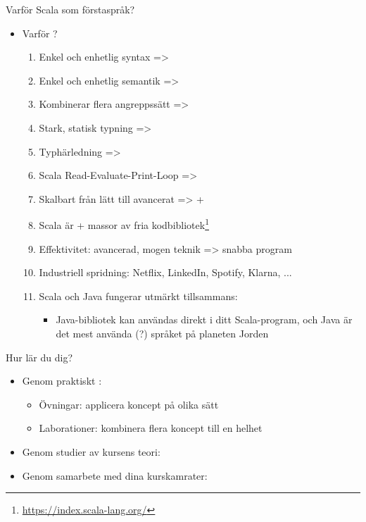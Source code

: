 \begin{SlideExtra}{Varför Scala som förstaspråk?}
\begin{itemize}
\item Varför ?
\begin{enumerate}
\item Enkel och enhetlig syntax => 
\item Enkel och enhetlig semantik => 
\item Kombinerar flera angreppssätt => 
\item Stark, statisk typning =>  
\item Typhärledning => 
\item Scala Read-Evaluate-Print-Loop => 
\item Skalbart från lätt till avancerat =>  + 
\item Scala är  + massor av fria kodbibliotek\footnote{\url{https://index.scala-lang.org/}} 
\item Effektivitet: avancerad, mogen teknik => snabba program
\item Industriell spridning: Netflix, LinkedIn, Spotify, Klarna, ...
\item Scala och Java fungerar utmärkt tillsammans:
\begin{itemize}
\item Java-bibliotek kan användas direkt i ditt Scala-program, och Java är det mest använda (?) språket på planeten Jorden
\end{itemize}
\end{enumerate}
\end{itemize}
\end{SlideExtra}
\fi


\begin{Slide}{Hur lär du dig?}
\begin{itemize}
\item Genom praktiskt : 
\begin{itemize}
\item Övningar: applicera koncept på olika sätt
\item Laborationer: kombinera flera koncept till en helhet
\end{itemize}
\item Genom studier av kursens teori: 
\item Genom samarbete med dina kurskamrater: 
\end{itemize}
\end{Slide}

